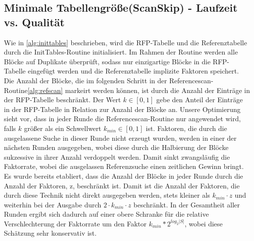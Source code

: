 \subsection{Minimale Tabellengröße(ScanSkip) - Laufzeit vs. Qualität}
Wie in \ref{alg:inittables} beschrieben, wird die RFP-Tabelle und die Referenztabelle durch die InitTables-Routine initialisiert. Im Rahmen der Routine werden alle Blöcke auf Duplikate
überprüft, sodass nur einzigartige Blöcke in die RFP-Tabelle eingefügt werden und die Referenztabelle implizite Faktoren speichert. Die Anzahl der Blöcke, die im folgenden Schritt 
in der Referencescan-Routine\ref{alg:refscan} markeirt werden können, ist durch die Anzahl der Einträge in der RFP-Tabelle beschränkt. Der Wert $k\in [0,1]$ gebe den Anteil der
Einträge in der RFP-Tabelle in Relation zur Anzahl der Blöcke an. Unsere Optimierung sieht vor, dass in jeder Runde die Referencescan-Routine nur angewendet wird, falls $k$ größer
als ein Schwellwert $k_{min}\in [0,1]$ ist. Faktoren, die durch die ausgelassene Suche in dieser Runde nicht erzeugt wurden, werden in einer der nächsten Runden ausgegeben, wobei diese
durch die Halbierung der Blöcke sukzessive in ihrer Anzahl verdoppelt werden. Damit sinkt zwangsläufig die Faktorrate, wobei die ausgelassen Referenzsuche einen zeitlichen Gewinn bringt.
Es wurde bereits etabliert, dass die Anzahl der Blöcke in jeder Runde durch die Anzahl der Faktoren, z, beschränkt ist. Damit ist die Anzahl der Faktoren, die durch diese Technik nicht
direkt ausgegeben werden, stets kleiner als $k_{min} \cdot z$ und weiterhin bei der Ausgabe durch $2 \cdot k_{min} \cdot z$ beschränkt. In der Gesamtheit aller Runden ergibt sich dadurch
auf einer obere Schranke für die relative Verschlechterung der Faktorrate um den Faktor $k_{min} * 2^{log_2{|S|}}$, wobei diese Schätzung sehr konservativ ist.